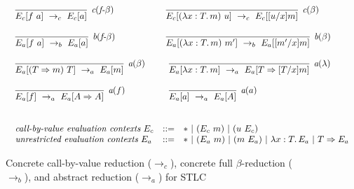 \documentclass{LMCS}
\newcommand{\To}[0]{\Rightarrow}
\begin{document}
\begin{figure}
\[
\begin{array}{l}
\begin{array}{lll}
\infer[\textit{c}(\textit{f-}\beta)]{E_c[f\ a]\ \to_c\ E_c[a]}{\ }
&\ &
\infer[\textit{c}(\beta)]{E_c[(\lambda x:T.\,m)\ u]\ \to_c\ E_c[[u/x]m]}{\ }
\\ \\
\infer[\textit{b}(\textit{f-}\beta)]{E_a[f\ a]\ \to_b\ E_a[a]}{\ }
&\ &
\infer[\textit{b}(\beta)]{E_a[(\lambda x:T.\,m)\ m']\ \to_b\
E_a[[m'/x]m]}{\ }
\\ \\
\infer[\textit{a}(\beta)]{E_a[(T \To m)\ T]\ \to_a\ E_a[m]}{\ }
&\ &\
\infer[\textit{a}(\lambda)]{E_a[\lambda x:T.\, m]\ \to_a\ E_a[T\To [T/x]m]}{\ }
\\ \\
\infer[\textit{a}(f)]{E_a[f]\ \to_a\ E_a[A\To A]}{\ }
&\ &\
\infer[\textit{a}(a)]{E_a[a]\ \to_a\ E_a[A]}{\ }

\end{array}
\\ \\ \\

\begin{array}{lll}
\textit{call-by-value evaluation contexts}\ E_c & ::= & *\ |\ (E_c\ m)\ |\ (u\ E_c) \\
\textit{unrestricted evaluation contexts}\ E_a & ::= & *\ |\ (E_a\ m)\ |\ (m\ E_a)\ |\ \lambda x:T.\, E_a\ |\ T\To E_a \\
\end{array}
\end{array}
\]
\caption{Concrete call-by-value reduction ($\to_c$), concrete full $\beta$-reduction ($\to_b$), and abstract reduction ($\to_a$) for STLC}
\label{fig:restlc}
\end{figure}
\end{document}
